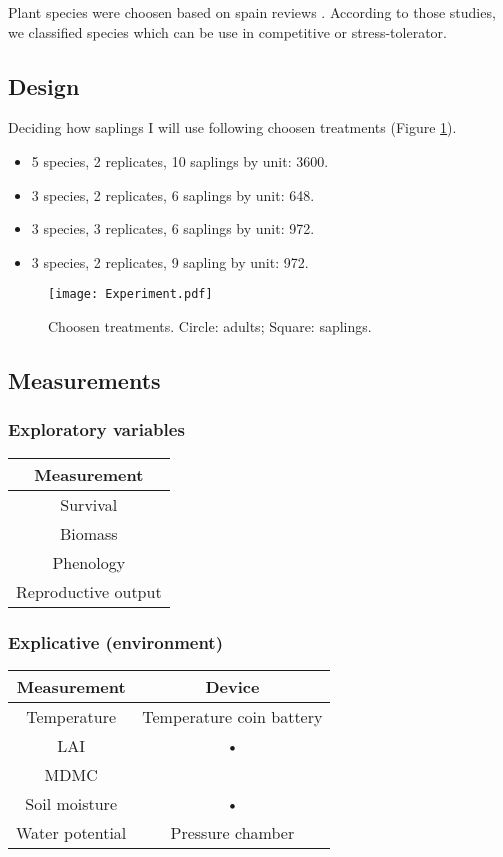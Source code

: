 \documentclass[12pt]{article} %
\begin{document}
Plant species were choosen based on spain reviews \citep{McCluney2012,Navarro2006, Jauffret2003}. According to those studies, we classified species which can be use in competitive or stress-tolerator.



\subsection{Design}

Deciding how saplings I will use following choosen treatments (Figure \ref{exp}).

\begin{itemize}
\item 5 species, 2 replicates, 10 saplings by unit: 3600.
\item 3 species, 2 replicates, 6 saplings by unit: 648.
\item 3 species, 3 replicates, 6 saplings by unit: 972.
\item 3 species, 2 replicates, 9 sapling by unit: 972.
\end{itemize}


\begin{figure} %
\begin{center}
\texttt{[image: Experiment.pdf]}
\end{center}
\caption{Choosen treatments. Circle: adults; Square: saplings. \label{exp}}
\end{figure}


\subsection{Measurements}

\subsubsection{Exploratory variables}
\begin{tabular}{c}
Measurement \\ 
\hline
Survival \\ 
Biomass \\ 
Phenology \\ 
Reproductive output \\
\hline 
\end{tabular}

\subsubsection{Explicative (environment)}
\begin{tabular}{cc}
Measurement & Device \\ 
\hline
Temperature & Temperature coin battery \\ 
LAI & • \\ 
MDMC &  \\ 
Soil moisture & • \\ 
Water potential & Pressure chamber \\ 
\hline 
\end{tabular} 
\end{document}
